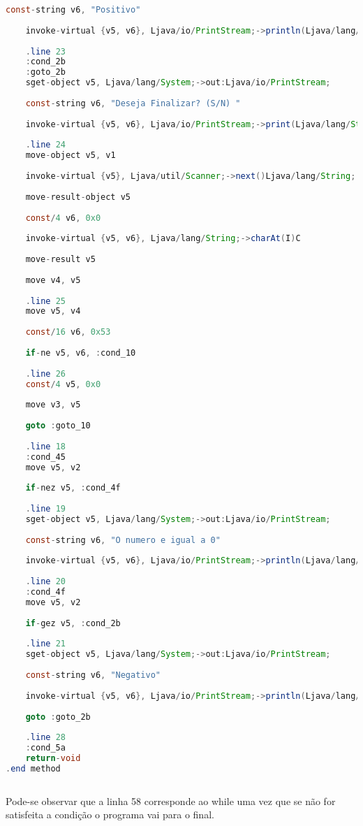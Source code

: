 \documentclass[hidelinks,12pt]{article}
\begin{document}
\begin{lstlisting}[caption=Smali resultante do .java,language=java]
	const-string v6, "Positivo"
	
	invoke-virtual {v5, v6}, Ljava/io/PrintStream;->println(Ljava/lang/String;)V
	
	.line 23
	:cond_2b
	:goto_2b
	sget-object v5, Ljava/lang/System;->out:Ljava/io/PrintStream;
	
	const-string v6, "Deseja Finalizar? (S/N) "
	
	invoke-virtual {v5, v6}, Ljava/io/PrintStream;->print(Ljava/lang/String;)V
	
	.line 24
	move-object v5, v1
	
	invoke-virtual {v5}, Ljava/util/Scanner;->next()Ljava/lang/String;
	
	move-result-object v5
	
	const/4 v6, 0x0
	
	invoke-virtual {v5, v6}, Ljava/lang/String;->charAt(I)C
	
	move-result v5
	
	move v4, v5
	
	.line 25
	move v5, v4
	
	const/16 v6, 0x53
	
	if-ne v5, v6, :cond_10
	
	.line 26
	const/4 v5, 0x0
	
	move v3, v5
	
	goto :goto_10
	
	.line 18
	:cond_45
	move v5, v2
	
	if-nez v5, :cond_4f
	
	.line 19
	sget-object v5, Ljava/lang/System;->out:Ljava/io/PrintStream;
	
	const-string v6, "O numero e igual a 0"
	
	invoke-virtual {v5, v6}, Ljava/io/PrintStream;->println(Ljava/lang/String;)V
	
	.line 20
	:cond_4f
	move v5, v2
	
	if-gez v5, :cond_2b
	
	.line 21
	sget-object v5, Ljava/lang/System;->out:Ljava/io/PrintStream;
	
	const-string v6, "Negativo"
	
	invoke-virtual {v5, v6}, Ljava/io/PrintStream;->println(Ljava/lang/String;)V
	
	goto :goto_2b
	
	.line 28
	:cond_5a
	return-void
.end method	
	
	\end{lstlisting}
	
	Pode-se observar que a linha 58 corresponde ao while uma vez que se não for satisfeita a condição o programa vai para o final.
	
\end{document}

